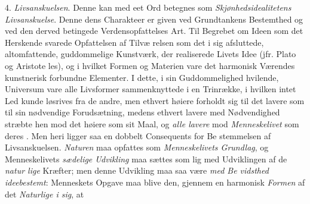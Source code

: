 4. \emph{Livsanskuelsen}. Denne kan med eet Ord betegnes
som \emph{Skjønhedsidealitetens Livsanskuelse}. Denne
dens Charakteer er given ved Grundtankens Bestemthed og
ved den derved betingede Verdensopfattelses Art. Til Begrebet
om Ideen som det Herskende svarede Opfattelsen af Tilvæ\-%
relsen som det i sig afsluttede, altomfattende, guddommelige
Kunstværk, der realiserede Livets Idee (jfr. Plato og Aristote\-%
les), og i hvilket Formen og Materien vare det harmonisk
Værendes kunstnerisk forbundne Elementer. I dette, i sin
Guddommelighed hvilende, Universum vare alle Livsformer
sammenknyttede i en Trinrække, i hvilken intet Led kunde
løsrives fra de andre, men ethvert høiere forholdt sig til det
lavere som til sin nødvendige Forudsætning, medens ethvert
lavere med Nødvendighed stræbte hen mod det høiere som
sit Maal, og \emph{alle lavere} mod \emph{Menneskelivet} som deres
. Men heri ligger saa en dobbelt Consequents for Be\-%
stemmelsen af Livsanskuelsen. \emph{Naturen} maa opfattes som
\emph{Menneskelivets Grundlag}, og Menneskelivets \emph{sædelige
Udvikling} maa sættes som lig med Udviklingen af de \emph{natur\-%
lige} Kræfter; men denne Udvikling maa saa være \emph{med Be\-%
vidsthed ideebestemt}: Menneskets Opgave maa blive den,
gjennem en harmonisk \emph{Formen} af det \emph{Naturlige i sig}, at
%
%
%
%
